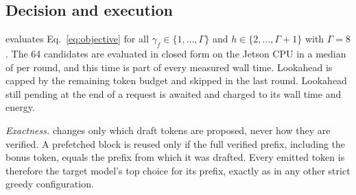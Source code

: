\subsection{Decision and execution}
\cape{} evaluates Eq.~\eqref{eq:objective} for all $\gamma_f\in\{1,\dots,\Gamma\}$ and $h\in\{2,\dots,\Gamma+1\}$ with $\Gamma=8$. The 64 candidates are evaluated in closed form on the Jetson CPU in a median of  per round, and this time is part of every measured wall time. Lookahead is capped by the remaining token budget and skipped in the last round. Lookahead still pending at the end of a request is awaited and charged to its wall time and energy.

\emph{Exactness.} \cape{} changes only which draft tokens are proposed, never how they are verified. A prefetched block is reused only if the full verified prefix, including the bonus token, equals the prefix from which it was drafted. Every emitted token is therefore the target model's top choice for its prefix, exactly as in any other strict greedy configuration.
